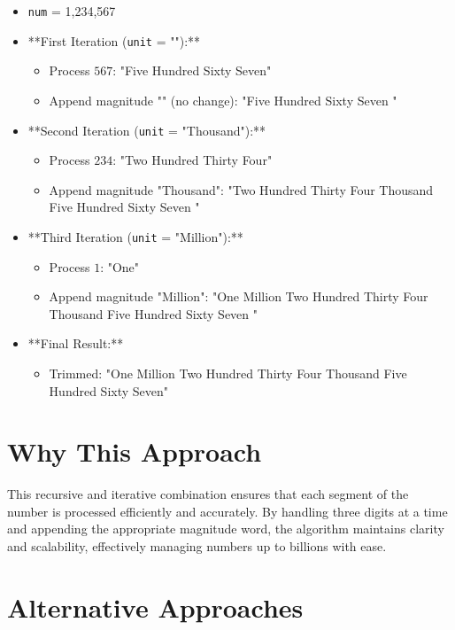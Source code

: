 \begin{itemize}
    \item \texttt{num} = 1,234,567
    \item **First Iteration (\texttt{unit} = ""):**
    \begin{itemize}
        \item Process \(567\): "Five Hundred Sixty Seven"
        \item Append magnitude "" (no change): "Five Hundred Sixty Seven "
    \end{itemize}
    \item **Second Iteration (\texttt{unit} = "Thousand"):**
    \begin{itemize}
        \item Process \(234\): "Two Hundred Thirty Four"
        \item Append magnitude "Thousand": "Two Hundred Thirty Four Thousand Five Hundred Sixty Seven "
    \end{itemize}
    \item **Third Iteration (\texttt{unit} = "Million"):**
    \begin{itemize}
        \item Process \(1\): "One"
        \item Append magnitude "Million": "One Million Two Hundred Thirty Four Thousand Five Hundred Sixty Seven "
    \end{itemize}
    \item **Final Result:**
    \begin{itemize}
        \item Trimmed: "One Million Two Hundred Thirty Four Thousand Five Hundred Sixty Seven"
    \end{itemize}
\end{itemize}

\section*{Why This Approach}

This recursive and iterative combination ensures that each segment of the number is processed efficiently and accurately. By handling three digits at a time and appending the appropriate magnitude word, the algorithm maintains clarity and scalability, effectively managing numbers up to billions with ease.

\section*{Alternative Approaches}

